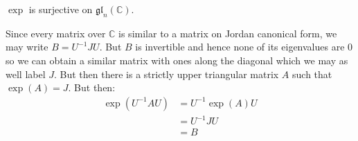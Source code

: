     \begin{problem}
        $\exp$ is surjective on $\mathfrak{gl}_{n}(\mathbb{C})$.
    \end{problem}
    \begin{solution}
        Since every matrix over $\mathbb{C}$ is similar to a matrix on Jordan
        canonical form, we may write $B=U^{\minus{1}}JU$. But $B$ is invertible
        and hence none of its eigenvalues are 0 so we can obtain a similar
        matrix with ones along the diagonal which we may as well label $J$. But
        then there is a strictly upper triangular matrix $A$ such that
        $\exp(A)=J$. But then:
        \begin{subequations}
            \begin{align}
                \exp(U^{\minus{1}}AU)&=U^{\minus{1}}\exp(A)U\\
                &=U^{\minus{1}}JU\\
                &=B
            \end{align}
        \end{subequations}
    \end{solution}